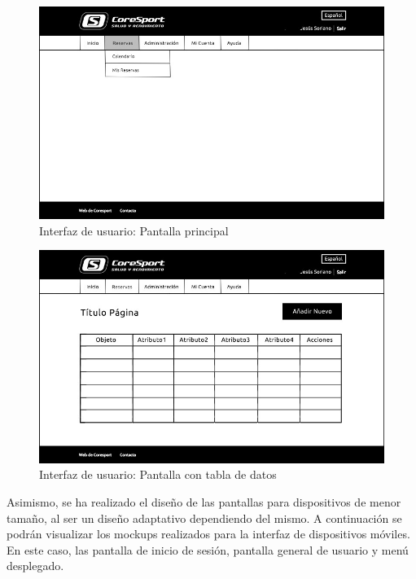 \begin{figure}[h!]
\centering
  \includegraphics[scale=.40]{img/interfaz/pantalla-principal.jpg}
  \caption{Interfaz de usuario: Pantalla principal}
  \label{fig:interfaz-pantalla-principal}
\end{figure}

\vspace{10mm}

\begin{figure}[h!]
\centering
  \includegraphics[scale=.40]{img/interfaz/cuadro-general.jpg}
  \caption{Interfaz de usuario: Pantalla con tabla de datos}
  \label{fig:interfaz-cuadro-general}
\end{figure}


Asimismo, se ha realizado el diseño de las pantallas para dispositivos de menor tamaño, al ser un diseño adaptativo dependiendo del mismo. A continuación se podrán visualizar los mockups realizados para la interfaz de dispositivos móviles. En este caso, las pantalla de inicio de sesión, pantalla general de usuario y menú desplegado.


